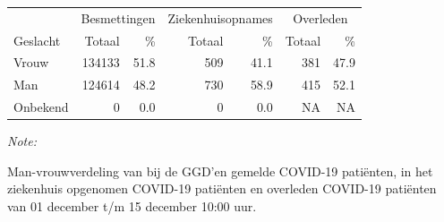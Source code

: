 \documentclass[
  english,
  man,floatsintext]{apa6}
\begin{document}
\begin{table}
\centering\begingroup\fontsize{11}{13}\selectfont

\begin{threeparttable}
\begin{tabular}{lrrrrrr}
\toprule
\multicolumn{1}{c}{ } & \multicolumn{2}{c}{Besmettingen} & \multicolumn{2}{c}{Ziekenhuisopnames} & \multicolumn{2}{c}{Overleden} \\
\cmidrule(l{3pt}r{3pt}){2-3} \cmidrule(l{3pt}r{3pt}){4-5} \cmidrule(l{3pt}r{3pt}){6-7}
Geslacht & Totaal & \% & Totaal & \% & Totaal & \%\\
\midrule
Vrouw & 134133 & 51.8 & 509 & 41.1 & 381 & 47.9\\
Man & 124614 & 48.2 & 730 & 58.9 & 415 & 52.1\\
Onbekend & 0 & 0.0 & 0 & 0.0 & NA & NA\\
\bottomrule
\end{tabular}
\begin{tablenotes}
\item \textit{Note: } 
\item Man-vrouwverdeling van bij de GGD’en gemelde COVID-19 patiënten, in het ziekenhuis opgenomen COVID-19 patiënten en overleden COVID-19 patiënten van 01 december t/m 15 december 10:00 uur.
\end{tablenotes}
\end{threeparttable}
\endgroup{}
\end{table}
\newpage
\end{document}

